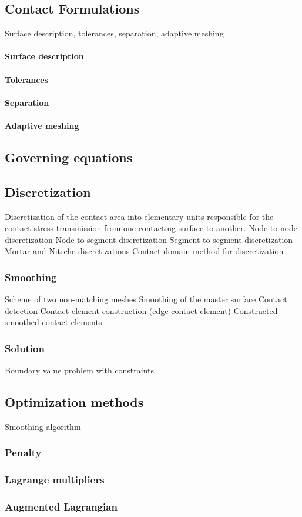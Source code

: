 \subsection{Contact Formulations}
Surface description, tolerances, separation, adaptive meshing
\paragraph{Surface description}
\paragraph{Tolerances}
\paragraph{Separation}
\paragraph{Adaptive meshing}
\subsection{Governing equations}


\subsection{Discretization}
Discretization of the contact area into elementary units responsible
for the contact stress transmission from one contacting surface to
another.
Node-to-node discretization
Node-to-segment discretization
Segment-to-segment discretization
Mortar and Nitsche discretizations
Contact domain method for discretization


\subsubsection{Smoothing}
Scheme of two non-matching meshes
Smoothing of the master surface
Contact detection
Contact element construction (edge contact element)
Constructed smoothed contact elements

\subsubsection{Solution}
Boundary value problem with constraints

\subsection{Optimization methods}
Smoothing algorithm 
\subsubsection{Penalty}
\subsubsection{Lagrange multipliers}
\subsubsection{Augmented Lagrangian}

